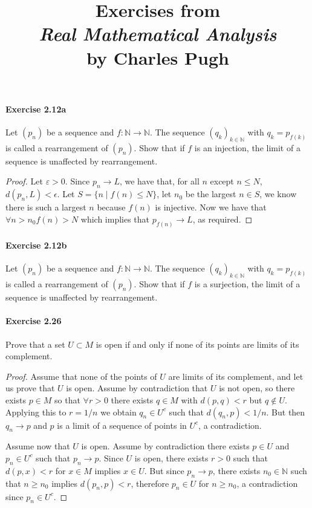 \documentclass{article}
\title{\textbf{
Exercises from \\
\textit{Real Mathematical Analysis} \\
by Charles Pugh
}}
\date{}
\begin{document}
\maketitle



\paragraph{Exercise 2.12a} Let $(p_n)$ be a sequence and $f:\mathbb{N}\to\mathbb{N}$. The sequence $(q_k)_{k\in\mathbb{N}}$ with $q_k=p_{f(k)}$ is called a rearrangement of $(p_n)$. Show that if $f$ is an injection, the limit of a sequence is unaffected by rearrangement.
\begin{proof}
    Let $\varepsilon>0$. Since $p_n \rightarrow L$, we have that, for all $n$ except $n \leq N$, $d\left(p_n, L\right)<\epsilon$. Let $S=\{n \mid f(n) \leq N\}$, let $n_0$ be the largest $n \in S$, we know there is such a largest $n$ because $f(n)$ is injective. Now we have that $\forall n>n_0 f(n)>N$ which implies that $p_{f(n)} \rightarrow L$, as required.
\end{proof}



\paragraph{Exercise 2.12b} Let $(p_n)$ be a sequence and $f:\mathbb{N}\to\mathbb{N}$. The sequence $(q_k)_{k\in\mathbb{N}}$ with $q_k=p_{f(k)}$ is called a rearrangement of $(p_n)$. Show that if $f$ is a surjection, the limit of a sequence is unaffected by rearrangement.


\paragraph{Exercise 2.26} Prove that a set $U \subset M$ is open if and only if none of its points are limits of its complement.
\begin{proof}
    Assume that none of the points of $U$ are limits of its complement, and let us prove that $U$ is open. Assume by contradiction that $U$ is not open, so there exists $p \in M$ so that $\forall r>0$ there exists $q \in M$ with $d(p, q)<r$ but $q \notin U$. Applying this to $r=1 / n$ we obtain $q_n \in U^c$ such that $d\left(q_n, p\right)<1 / n$. But then $q_n \rightarrow p$ and $p$ is a limit of a sequence of points in $U^c$, a contradiction.

Assume now that $U$ is open. Assume by contradiction there exists $p \in U$ and $p_n \in U^c$ such that $p_n \rightarrow p$. Since $U$ is open, there exists $r>0$ such that $d(p, x)<r$ for $x \in M$ implies $x \in U$. But since $p_n \rightarrow p$, there exists $n_0 \in \mathbb{N}$ such that $n \geq n_0$ implies $d\left(p_n, p\right)<r$, therefore $p_n \in U$ for $n \geq n_0$, a contradiction since $p_n \in U^c$.
\end{proof}
\end{document}
